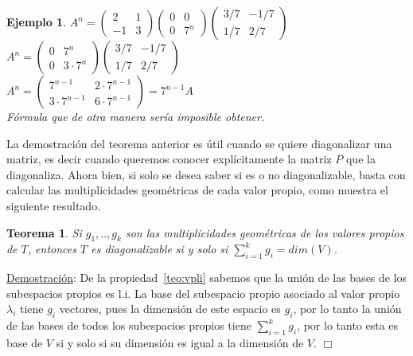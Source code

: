\documentclass[12pt]{book}
\newtheorem{teo}{Teorema}
\newtheorem{ejem}{Ejemplo}
\begin{document}
{\begin{ejem}
{\hspace{4 cm}$A^n=\left(\begin{matrix}2 & 1\\ -1 & 3 \end{matrix}\right)\left(\begin{matrix}0 & 0\\ 0 & 7^n 
\end{matrix}\right)\left(\begin{matrix}3/7 & -1/7\\ 1/7 & 2/7 \end{matrix}\right)$\\

\hspace{4 cm}$A^n=\left(\begin{matrix}0 & 7^n\\ 0 & 3\cdot7^n \end{matrix}\right)\left(\begin{matrix}3/7 & -1/7\\ 1/7 & 2/7 \end{matrix}\right)$\\

\hspace{4 cm}$A^n=\left(\begin{matrix}7^{n-1} & 2\cdot7^{n-1}\\ 3\cdot7^{n-1} & 6\cdot7^{n-1} \end{matrix}\right)=7^{n-1}A$\\

Fórmula que de otra manera sería imposible obtener.
}
\end{ejem}

\vspace{0.3 cm}

La demostración del teorema anterior es útil cuando se quiere diagonalizar una matriz, es decir cuando queremos conocer explícitamente la matriz $P$ que la diagonaliza. 
Ahora bien, si solo se desea saber si es o no diagonalizable, basta con calcular las multiplicidades geométricas de cada valor propio, como muestra el siguiente resultado.

\begin{teo}\label{teo:sumg}
Si $g_1,..,g_k$ son las multiplicidades geométricas de los valores propios de $T$, entonces
$T$ es diagonalizable si y solo si $\displaystyle{ \sum_{i=1}^k g_i}=dim(V)$.
\end{teo}
 \underline{Demostración}: {
De la propiedad~\ref{teo:vpli} sabemos que la unión de las bases de los subespacios propios es l.i.
La base del subespacio propio asociado al valor propio $\lambda_i$ tiene $g_i$ vectores, pues la dimensión de este espacio es $g_i$, por lo tanto la unión de las bases de todos los subespacios propios tiene ${\displaystyle \sum_{i=1}^k g_i}$, por lo tanto esta es base de $V$ si y solo si su dimensión es igual a la dimensión de $V$.
 \hfill $\Box$
}

}
\end{document}
